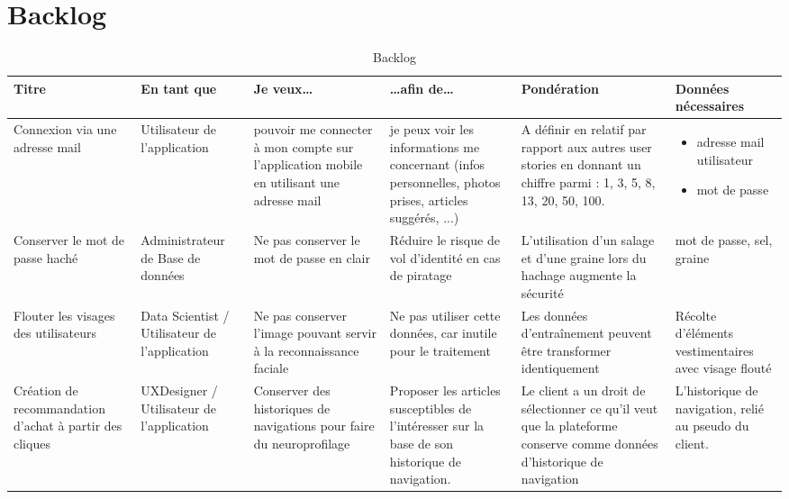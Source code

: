 \documentclass[12pt]{article}
\begin{document}
\section{Backlog}
\begin{landscape}
\begin{table}[H]
\scriptsize
\caption{Backlog}
\begin{tabular}{p{3cm}p{3cm}p{4cm}p{4cm}p{4cm}p{4cm}}
\hline  Titre	\cellcolor{gray!25}&En tant que \cellcolor{gray!25}& Je veux\dots\cellcolor{gray!25}&  \dots afin de\dots\cellcolor{gray!25}& \bf Pondération\cellcolor{gray!25} & \bf Données nécessaires\cellcolor{gray!25} \\
\hline  Connexion via une adresse mail& 
Utilisateur de l'application &
  pouvoir me connecter à mon compte sur l'application mobile en utilisant une adresse mail& je peux voir les informations me concernant (infos personnelles, photos prises, articles suggérés, ...)& 
  A définir en relatif par rapport aux autres user stories en donnant un chiffre parmi : 1, 3, 5, 8, 13, 20, 50, 100.&
  \begin{itemize}
  \item adresse mail utilisateur
  \item mot de passe 
   \end{itemize}\\
\hline   Conserver le mot de passe haché& Administrateur de Base de données & Ne pas conserver le mot de passe en clair & 
Réduire le risque de vol d’identité en cas de piratage  & 
L’utilisation d’un salage et d’une graine lors du hachage augmente la sécurité & mot de passe, sel, graine\\
\hline   Flouter les visages des utilisateurs & Data Scientist / Utilisateur de l’application & Ne pas conserver l’image pouvant servir à la reconnaissance faciale & Ne pas utiliser cette données, car inutile pour le traitement & Les données d’entraînement peuvent être transformer identiquement & Récolte d’éléments vestimentaires avec visage flouté\\
\hline   Création de recommandation d’achat à partir des cliques & UXDesigner / Utilisateur de l’application & Conserver des historiques de navigations pour faire du neuroprofilage  & Proposer les articles susceptibles de l’intéresser sur la base de son historique de navigation.  & Le client a un droit de sélectionner ce qu’il veut que la plateforme conserve comme données d’historique de navigation & L’historique de navigation, relié au pseudo du client. \\

\end{tabular}
\end{table}
\end{landscape}
\end{document}

